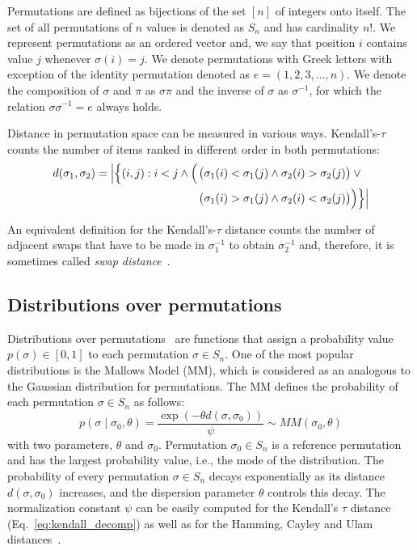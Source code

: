 \documentclass[runningheads]{llncs}
\newcommand{\Prob}{\ensuremath{p}}
\begin{document}
Permutations are defined as bijections of the set $[n]$ of integers onto itself. The set of all permutations of $n$ values is denoted as $S_n$ and has cardinality $n!$. We represent permutations as an ordered vector and, we say that position $i$ contains value $j$ whenever $\sigma(i)=j$. We denote permutations with Greek letters with exception of the identity permutation denoted as $e=(1, 2, 3, \dotsc,n)$. We denote the composition of $\sigma$ and $\pi$ as $\sigma\pi$ and the inverse of $\sigma$ as $\sigma^{-1}$, for which the relation $\sigma\sigma^{-1}=e$ always holds.


Distance in permutation space can be measured in various ways.  Kendall's-$\tau$ counts the number of items ranked in different order in both permutations:
%
\begin{equation}
\begin{split}
d(\sigma _{1},\sigma_{2})=\left\lvert\Bigl\{(i,j):i<j \land \phantom{}\Bigl(\right.&\bigl(\sigma_{1}(i) < \sigma_{1}(j)\land \sigma_{2}(i)>\sigma_{2}(j)\bigr)\lor \phantom{} \\
 &\bigl(\sigma_{1}(i)>\sigma_{1}(j)\land \sigma_{2}(i)<\sigma_{2}(j)\bigr)\Bigr)\Bigr\}\Bigr\rvert\\
 \end{split}
 \label{eq:kendall_decomp}
\end{equation}

An equivalent definition for the Kendall's-$\tau$ distance counts the number of adjacent swaps that have to be made in $\sigma_1^{-1}$ to obtain $\sigma_2^{-1}$ and, therefore, it is sometimes called \emph{swap distance}~\citep{ZaeStoBar2014:ppsn}.


\subsection{Distributions over permutations}
Distributions over permutations~\cite{critchlow91} are functions that assign a probability value  $\Prob(\sigma)\in[0,1]$ to each permutation $\sigma \in S_n$. One of the most popular distributions is the Mallows Model (MM), which is considered as an analogous to the Gaussian distribution for permutations. The MM defines the probability of each permutation $\sigma\in S_n$ as follows:
%
\begin{equation}\label{eq:MM}
\Prob(\sigma \mid \sigma_0, \theta )= \frac{\exp(-\theta d(\sigma, \sigma_0))}{\psi} \sim MM(\sigma_0, \theta)
\end{equation}
%
with two parameters, $\theta$ and $\sigma_0$. Permutation $\sigma_0\in S_n$ is a reference permutation and has the largest probability value, i.e., the mode of the distribution. The probability of every permutation $\sigma\in S_n$ decays exponentially as its distance $d(\sigma,\sigma_0)$ increases, and the dispersion parameter $\theta$  controls this decay.  The normalization constant $\psi$ can be easily computed for the Kendall's $\tau$ distance (Eq.~\eqref{eq:kendall_decomp}) as well as for the Hamming, Cayley and Ulam distances~\cite{IruCalLoz2016permallows}.
\end{document}
